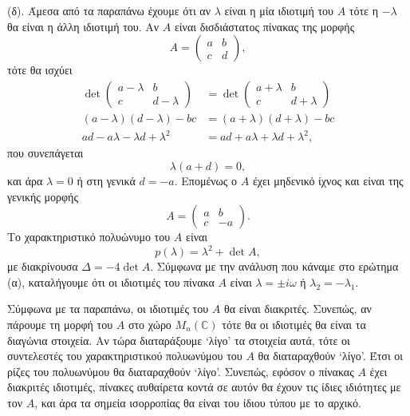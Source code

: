 \begin{solution}
    (δ). Άμεσα από τα παραπάνω έχουμε ότι αν \( \lambda \) είναι η μία ιδιοτιμή
    του \( A \) τότε η \( -\lambda \) θα είναι η άλλη ιδιοτιμή του. Αν \( A \)
    είναι δισδιάστατος πίνακας της μορφής
    \[
        A =
        \begin{pmatrix}
            a & b \\
            c & d
        \end{pmatrix},
    \]
    τότε θα ισχύει
    \begin{align*}
        \det{\begin{pmatrix}
                a - \lambda & b \\
                c & d - \lambda
        \end{pmatrix}} &=
        \det{\begin{pmatrix}
                a + \lambda & b \\
                c & d + \lambda
        \end{pmatrix}} \\
        (a - \lambda)(d - \lambda) - bc &=
        (a + \lambda)(d + \lambda) - bc \\
        ad - a\lambda - \lambda d + \lambda^2 &=
        ad + a\lambda + \lambda d + \lambda^2,
    \end{align*}
    που συνεπάγεται
    \[
        \lambda(a + d) = 0,
    \]
    και άρα \( \lambda = 0 \) ή στη γενικά \( d = -a \). Επομένως ο \( A \) έχει
    μηδενικό ίχνος και είναι της γενικής μορφής
    \[
        A =
        \begin{pmatrix}
            a & b \\
            c & -a
        \end{pmatrix}.
    \]
    Το χαρακτηριστικό πολυώνυμο του \( A \) είναι
    \[
        p(\lambda) = \lambda^2 + \det{A},
    \]
    με διακρίνουσα \( \Delta = -4 \det{A} \). Σύμφωνα με την ανάλυση που κάναμε
    στο ερώτημα (α), καταλήγουμε ότι οι ιδιοτιμές του πίνακα \( A \) είναι \(
    \lambda = \pm i\omega \) ή \( \lambda_2 = - \lambda_1 \).

    Σύμφωνα με τα παραπάνω, οι ιδιοτιμές του \( A \) θα είναι διακριτές.
    Συνεπώς, αν πάρουμε τη μορφή  του \( A \) στο χώρο \(
    M_n\left(\mathbb{C}\right) \) τότε θα οι ιδιοτιμές θα είναι τα διαγώνια
    στοιχεία. Αν τώρα διαταράξουμε \enquote*{λίγο} τα στοιχεία αυτά, τότε οι
    συντελεστές του χαρακτηριστικού πολυωνύμου του \( A \) θα διαταραχθούν
    \enquote*{λίγο}. Έτσι οι ρίζες του πολυωνύμου θα διαταραχθούν
    \enquote*{λίγο}. Συνεπώς, εφόσον ο πίνακας \( A \) έχει διακριτές ιδιοτιμές,
    πίνακες αυθαίρετα κοντά σε αυτόν θα έχουν τις ίδιες ιδιότητες με τον
    \( A \), και άρα τα σημεία ισορροπίας θα είναι του ίδιου τύπου με το αρχικό.
\end{solution}
